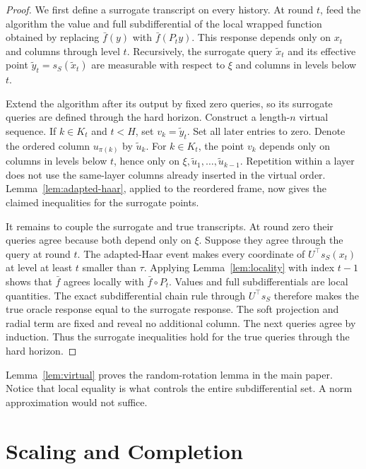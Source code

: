 \documentclass[twoside]{article}
\begin{document}
\begin{proof}
We first define a surrogate transcript on every history. At round $t$, feed
the algorithm the value and full subdifferential of the local wrapped function
obtained by replacing $\bar f(y)$ with $\bar f(P_ty)$. This response depends
only on $x_t$ and columns through level $t$. Recursively, the surrogate query
$\widetilde x_t$ and its effective point
$\widetilde y_t=s_S(\widetilde x_t)$ are measurable with respect to $\xi$ and
columns in levels below $t$.

Extend the algorithm after its output by fixed zero queries, so its surrogate
queries are defined through the hard horizon. Construct a length-$n$ virtual
sequence. If $k\in K_t$ and $t<H$, set $v_k=\widetilde y_t$. Set all later
entries to zero. Denote the ordered column $u_{\pi(k)}$ by $\widetilde u_k$.
For $k\in K_t$, the point $v_k$ depends only on columns in levels below $t$,
hence only on
$\xi,\widetilde u_1,\ldots,\widetilde u_{k-1}$. Repetition within a layer does
not use the same-layer columns already inserted in the virtual order.
Lemma~\ref{lem:adapted-haar}, applied to the reordered frame, now gives the
claimed inequalities for the surrogate points.

It remains to couple the surrogate and true transcripts. At round zero their
queries agree because both depend only on $\xi$. Suppose they agree through
the query at round $t$. The adapted-Haar event makes every coordinate of
$U^\top s_S(x_t)$ at level at least $t$ smaller than $\tau$. Applying
Lemma~\ref{lem:locality} with index $t-1$ shows that $\bar f$ agrees locally
with $\bar f\circ P_t$. Values and full subdifferentials are local quantities.
The exact subdifferential chain rule through $U^\top s_S$ therefore makes the
true oracle response equal to the surrogate response. The soft projection and
radial term are fixed and reveal no additional column. The next queries agree
by induction. Thus the surrogate inequalities hold for the true queries
through the hard horizon.
\end{proof}

Lemma~\ref{lem:virtual} proves the random-rotation lemma in the main paper.
Notice that local equality is what controls the entire subdifferential set. A
norm approximation would not suffice.

\section{Scaling and Completion}
\label{app:scaling}
\end{document}
